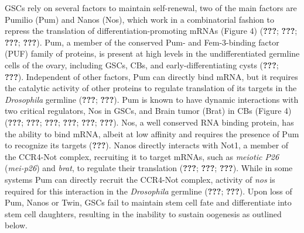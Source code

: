 \documentclass[12pt,oneside]{reedthesis}
\begin{document}
GSCs rely on several factors to maintain self-renewal, two of the main
factors are Pumilio (Pum) and Nanos (Nos), which work in a combinatorial
fashion to repress the translation of differentiation-promoting mRNAs
(Figure 4) ({\textbf{???}}; {\textbf{???}}; {\textbf{???}}; {\textbf{???}}).
Pum, a member of the conserved Pum- and Fem-3-binding factor (PUF)
family of proteins, is present at high levels in the undifferentiated
germline cells of the ovary, including GSCs, CBs, and
early-differentiating cysts ({\textbf{???}}; {\textbf{???}}). Independent of
other factors, Pum can directly bind mRNA, but it requires the catalytic
activity of other proteins to regulate translation of its targets in the
\emph{Drosophila} germline ({\textbf{???}}; {\textbf{???}}). Pum is known
to have dynamic interactions with two critical regulators, Nos in GSCs,
and Brain tumor (Brat) in CBs (Figure 4) ({\textbf{???}}; {\textbf{???}}; {\textbf{???}}; {\textbf{???}}; {\textbf{???}}; {\textbf{???}}). Nos, a well conserved RNA binding protein, has the
ability to bind mRNA, albeit at low affinity and requires the presence
of Pum to recognize its targets ({\textbf{???}}). Nanos directly
interacts with Not1, a member of the CCR4-Not complex, recruiting it to
target mRNAs, such as \emph{meiotic P26} (\emph{mei-p26}) and \emph{brat}, to regulate
their translation ({\textbf{???}}; {\textbf{???}}; {\textbf{???}}).
While in some systems Pum can directly recruit the CCR4-Not complex,
activity of \emph{nos} is required for this interaction in the \emph{Drosophila}
germline ({\textbf{???}}; {\textbf{???}}). Upon loss of Pum, Nanos or Twin,
GSCs fail to maintain stem cell fate and differentiate into stem cell
daughters, resulting in the inability to sustain oogenesis as outlined
below.
\end{document}

